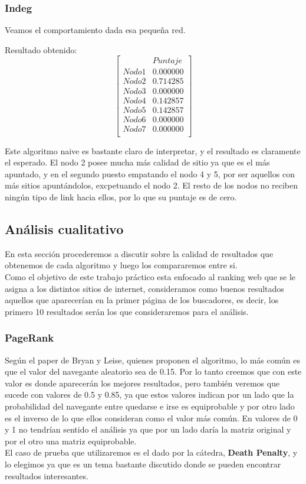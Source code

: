 \subsubsection{Indeg}
 	Veamos el comportamiento dada esa pequeña red.

 	Resultado obtenido:
   $$ 
\begin{bmatrix}
              &    Puntaje \\
 Nodo 1 &    0.000000 \\
 Nodo 2   &  0.714285 \\
 Nodo 3   &  0.000000 \\
 Nodo 4   &  0.142857 \\
 Nodo 5   &  0.142857 \\
 Nodo 6   &  0.000000 \\
 Nodo 7   &  0.000000 \\
\end{bmatrix} 
$$

Este algoritmo naive es bastante claro de interpretar, y el resultado es claramente el esperado. El nodo 2 posee mucha más calidad de sitio ya que es el más apuntado, y en el segundo puesto empatando el nodo 4 y 5, por ser aquellos con más sitios apuntándolos, excpetuando el nodo 2. El resto de los nodos no reciben ningún tipo de link hacia ellos, por lo que su puntaje es de cero.

\subsection{Análisis cualitativo}

En esta sección procederemos a discutir sobre la calidad de resultados que obtenemos de cada algoritmo y luego los compararemos entre si.\\
Como el objetivo de este trabajo práctico esta enfocado al ranking web que se le asigna a los distintos sitios de internet, consideramos como buenos resultados aquellos que aparecerían en la primer página de los buscadores, es decir, los primero 10 resultados serán los que consideraremos para el análisis.

\subsubsection{PageRank}
Según el paper de Bryan y Leise, quienes proponen el algoritmo, lo más común es que el valor del navegante aleatorio sea de 0.15. Por lo tanto creemos que con este valor es donde aparecerán los mejores resultados, pero también veremos que sucede con valores de 0.5 y 0.85, ya que estos valores indican por un lado que la probabilidad del navegante entre quedarse e irse es equiprobable y por otro lado es el inverso de lo que ellos consideran como el valor más común. En valores de 0 y 1 no tendrían sentido el análisis ya que por un lado daría la matriz original y por el otro una matriz equiprobable.\\
El caso de prueba que utilizaremos es el dado por la cátedra, \textbf{Death Penalty}, y lo elegimos ya que es un tema bastante discutido donde se pueden encontrar resultados interesantes.


